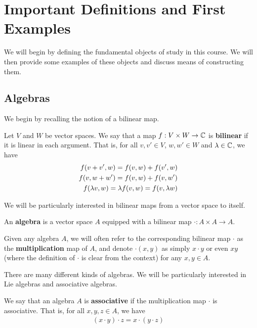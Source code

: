 \section{Important Definitions and First Examples}

We will begin by defining the fundamental objects of study in this course. We will then provide some examples of these objects and discuss means of constructing them.

\subsection{Algebras}

We begin by recalling the notion of a bilinear map.

\begin{boxdefinition}
    Let $V$ and $W$ be vector spaces. We say that a map $f: V \times W \to \mathbb{C}$ is \textbf{bilinear} if it is linear in each argument. That is, for all $v, v' \in V$, $w, w' \in W$ and $\lambda \in \mathbb{C}$, we have
    \begin{align*}
        \fof{v + v', w} = \fof{v, w} + \fof{v', w} \\
        \fof{v, w + w'} = \fof{v, w} + \fof{v, w'} \\
        \fof{\lambda v, w} = \lambda \fof{v, w} = \fof{v, \lambda w}
    \end{align*}
\end{boxdefinition}

We will be particularly interested in bilinear maps from a vector space to itself.

\begin{boxdefinition}[Algebra]
    An \textbf{algebra} is a vector space $A$ equipped with a bilinear map $\cdot: A \times A \to A$.
\end{boxdefinition}

\begin{boxconvention}
    Given any algebra $A$, we will often refer to the corresponding bilinear map $\cdot$ as the \textbf{multiplication} map of $A$, and denote $\cdot(x, y)$ as simply $x \cdot y$ or even $xy$ (where the definition of $\cdot$ is clear from the context) for any $x, y \in A$.
\end{boxconvention}

There are many different kinds of algebras. We will be particularly interested in Lie algebras and associative algebras.

\begin{boxdefinition}
    We say that an algebra $A$ is \textbf{associative} if the multiplication map $\cdot$ is associative. That is, for all $x, y, z \in A$, we have
    \begin{align*}
        (x \cdot y) \cdot z = x \cdot (y \cdot z)
    \end{align*}
\end{boxdefinition}

